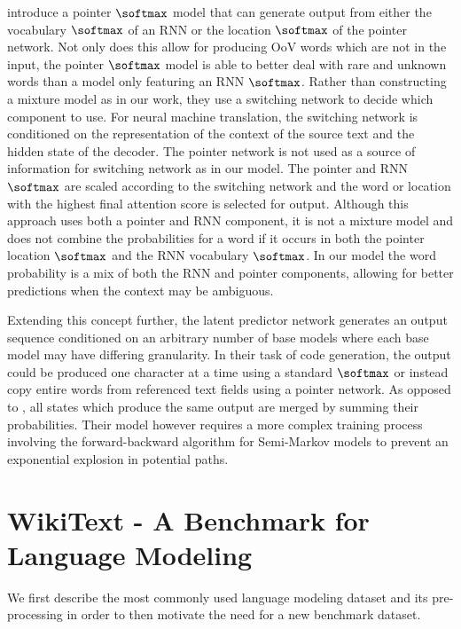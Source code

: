 \citet{Gulcehre2016} introduce a pointer $\softmax$ model that can generate output from either the vocabulary $\softmax$ of an RNN or the location $\softmax$ of the pointer network. Not only does this allow for producing OoV words which are not in the input, the pointer $\softmax$ model is able to better deal with rare and unknown words than a model only featuring an RNN $\softmax$.
Rather than constructing a mixture model as in our work, they use a switching network to decide which component to use. For neural machine translation, the switching network is conditioned on the representation of the context of the source text and the hidden state of the decoder. The pointer network is not used as a source of information for switching network as in our model. The pointer and RNN $\softmax$ are scaled according to the switching network and the word or location with the highest final attention score is selected for output. Although this approach uses both a pointer and RNN component, it is not a mixture model and does not combine the probabilities for a word if it occurs in both the pointer location $\softmax$ and the RNN vocabulary $\softmax$.
In our model the word probability is a mix of both the RNN and pointer components, allowing for better predictions when the context may be ambiguous.

Extending this concept further, the latent predictor network \cite{Ling2016} generates an output sequence conditioned on an arbitrary number of base models where each base model may have differing granularity. In their task of code generation, the output could be produced one character at a time using a standard $\softmax$ or instead copy entire words from referenced text fields using a pointer network. As opposed to \citet{Gulcehre2016}, all states which produce the same output are merged by summing their probabilities. Their model however requires a more complex training process involving the forward-backward algorithm for Semi-Markov models to prevent an exponential explosion in potential paths.

\section{WikiText - A Benchmark for Language Modeling} We first describe the most commonly used language modeling dataset and its pre-processing in order to then motivate the need for a new benchmark dataset.

